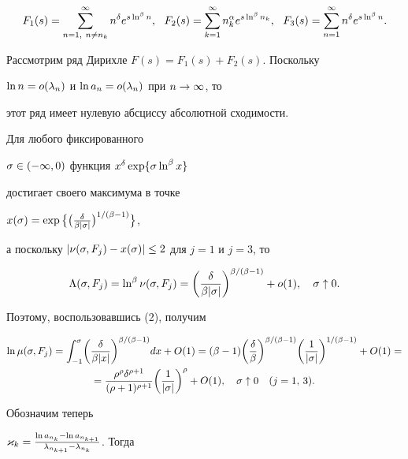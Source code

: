 \begin{pf}
$$


F_1(s)=\sum_{n=1,\ n\ne n_k}^\i n^{\d}e^{s\ln^\be n},\ \


F_2(s)=\sum_{k=1}^\i n_k^{\a} e^{s\ln^\be n_k},\ \


F_3(s)=\sum_{n=1}^\i n^{\d}e^{s\ln^\be n}.


$$





Рассмотрим ряд Дирихле $F(s)=F_1(s)+F_2(s)$. Поскольку


$\ln n=o(\lambda_n)$ и $\ln a_n=o(\lambda_n)$ при $n\to\infty$, то 


этот ряд имеет нулевую абсциссу абсолютной сходимости.





Для любого фиксированного


$\sigma\in (-\infty, 0)$ функция $x^{\delta}\exp\{\sigma\ln^\beta x\}$


достигает своего максимума в точке 


$x(\sigma)=\exp\big\{\big(\frac{\delta}{\beta|\sigma|}\big)^{1/(\beta-1)}\big\}$, 


а поскольку $|\nu(\sigma,F_j)-x(\sigma)|\le 2$ для $j=1$ и $j=3$, то 


$$


\L(\s,F_j)=\ln^\be\nu(\s,F_j)=


\left(\frac{\d}{\be|\s|}\right)^{\be/(\be-1)}+o(1),


\quad \s\uparrow 0.


$$ 


Поэтому, воспользовавшись (2), получим


\begin{multline}


\ln\mu(\s,F_j)=\int_{-1}^{\s}


\biggl(\frac{\d}{\be|x|}\biggr)^{\be/(\be-1)}dx+O(1)=


(\be-1)\biggl(\frac{\d}{\be}\biggr)^{\be/(\be-1)}


\biggl(\frac1{|\s|}\biggr)^{1/(\be-1)}+O(1)=\\


=\frac{\r^{\r}\d^{\r+1}}{(\r+1)^{\r+1}}\biggl(\frac1{|\s|}\biggr)^{\r}+O(1),


\quad\s\uparrow 0\quad(j=1,\,3).


\end{multline}


Обозначим теперь 


$\varkappa_k=\frac{\ln a_{n_k}-\ln a_{n_{k+1}}}{\lambda_{n_{k+1}}-\lambda_{n_k}}$. Тогда



\end{pf}
